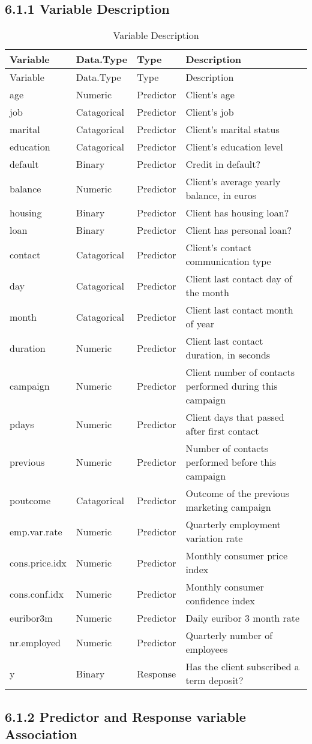 \documentclass[english,floatsintext,man]{apa6}
\begin{document}
\subsection{6.1.1 Variable Description}\label{variable-description}

\begin{longtable}[c]{@{}llll@{}}
\caption{Variable Description}\tabularnewline
\toprule
Variable & Data.Type & Type & Description\tabularnewline
\midrule
\endfirsthead
\toprule
Variable & Data.Type & Type & Description\tabularnewline
\midrule
\endhead
age & Numeric & Predictor & Client's age\tabularnewline
job & Catagorical & Predictor & Client's job\tabularnewline
marital & Catagorical & Predictor & Client's marital
status\tabularnewline
education & Catagorical & Predictor & Client's education
level\tabularnewline
default & Binary & Predictor & Credit in default?\tabularnewline
balance & Numeric & Predictor & Client's average yearly balance, in
euros\tabularnewline
housing & Binary & Predictor & Client has housing loan?\tabularnewline
loan & Binary & Predictor & Client has personal loan?\tabularnewline
contact & Catagorical & Predictor & Client's contact communication
type\tabularnewline
day & Catagorical & Predictor & Client last contact day of the
month\tabularnewline
month & Catagorical & Predictor & Client last contact month of
year\tabularnewline
duration & Numeric & Predictor & Client last contact duration, in
seconds\tabularnewline
campaign & Numeric & Predictor & Client number of contacts performed
during this campaign\tabularnewline
pdays & Numeric & Predictor & Client days that passed after first
contact\tabularnewline
previous & Numeric & Predictor & Number of contacts performed before
this campaign\tabularnewline
poutcome & Catagorical & Predictor & Outcome of the previous marketing
campaign\tabularnewline
emp.var.rate & Numeric & Predictor & Quarterly employment variation
rate\tabularnewline
cons.price.idx & Numeric & Predictor & Monthly consumer price
index\tabularnewline
cons.conf.idx & Numeric & Predictor & Monthly consumer confidence
index\tabularnewline
euribor3m & Numeric & Predictor & Daily euribor 3 month
rate\tabularnewline
nr.employed & Numeric & Predictor & Quarterly number of
employees\tabularnewline
y & Binary & Response & Has the client subscribed a term
deposit?\tabularnewline
\bottomrule
\end{longtable}

\subsection{6.1.2 Predictor and Response variable
Association}\label{predictor-and-response-variable-association}
\end{document}
